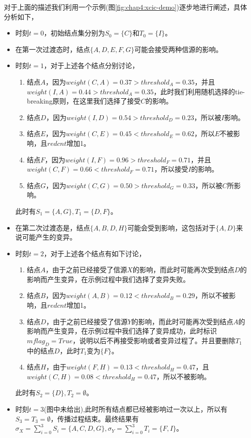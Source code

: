 对于上面的描述我们利用一个示例(图\ref{fig:chap4:xcic-demo})逐步地进行阐述，具体分析如下，
\begin{itemize}
\item 时刻$t=0$，初始结点集分别为$S_{0}=\{C\}$和$T_{0}=\{I\}$。
\item 在第一次过渡态时，结点$\{A, D, E, F, G\}$可能会接受两种信源的影响。
\item 时刻$t=1$，对于上述各个结点分别讨论，
	\begin{enumerate}
	\item 结点$A$，因为$weight(C, A) = 0.37 > threshold_{A}=0.35$，并且$weight(I, A) = 0.44 > threshold_{A}=0.35$，此时我们利用随机选择的tie-breaking原则，在这里我们选择了接受$C$的影响。
	\item 结点$D$，因为$weight(I, D) = 0.54 > threshold_{D}=0.23$，所以被$I$影响。
	\item 结点$E$，因为$weight(C, E) = 0.45 < threshold_{E}=0.62$，所以$E$不被影响，且$redcnt$增加1。
	\item 结点$F$，因为$weight(I, F) = 0.96 > threshold_{F}=0.71$，并且$weight(C, F) = 0.66 < threshold_{F}=0.71$，所以接受$I$的影响。
	\item 结点$G$，因为$weight(C, G) = 0.50 > threshold_{G}=0.33$，所以被$C$所影响。
	\end{enumerate}
	此时有$S_{1}=\{A, G\}, T_{1}=\{D, F\}$。
\item 在第二次过渡态是，结点$\{A, B, D, H\}$可能会受到影响，这包括对于$\{A, D\}$来说可能产生的变异。
\item 时刻$t=2$，对于上述各个结点有如下讨论，
	\begin{enumerate}
	\item 结点$A$，由于之前已经接受了信源$X$的影响，而此时可能再次受到结点$D$的影响而产生变异，在示例过程中我们选择了变异失败。
	\item 结点$B$，因为$weight(A, B)=0.12 < threshold_{B}=0.29$，所以不被影响，且$redcnt$增加1。
	\item 结点$D$，由于之前已经接受了信源$Y$的影响，而此时可能再次受到结点$A$的影响而产生变异，在示例过程中我们选择了变异成功，此时标识$mflag_{D}=True$，说明以后不再接受影响或者变异过程了。并且要删除$T_{1}$中的结点$D$，此时$T_{1}$变为$\{F\}$。
	\item 结点$H$，由于$weight(F, H)=0.13 < threshold_{H}=0.47$，且$weight(C, H)=0.08 < threshold_{H}=0.47$，所以不被影响。
	\end{enumerate}
	此时有$S_{2}=\{D\},T_{2}=\emptyset$。
\item 时刻$t=3$(图中未给出),此时所有结点都已经被影响过一次以上，所以有$S_{3}=T_{3}=\emptyset$，传播过程结束。最终结果有$\sigma_{X}=\sum_{i=0}^{3}S_{i}=\{A, C, D, G\}, \sigma_{Y}=\sum_{i=0}^{3}T_{i}=\{F, I\}$。
\end{itemize}


